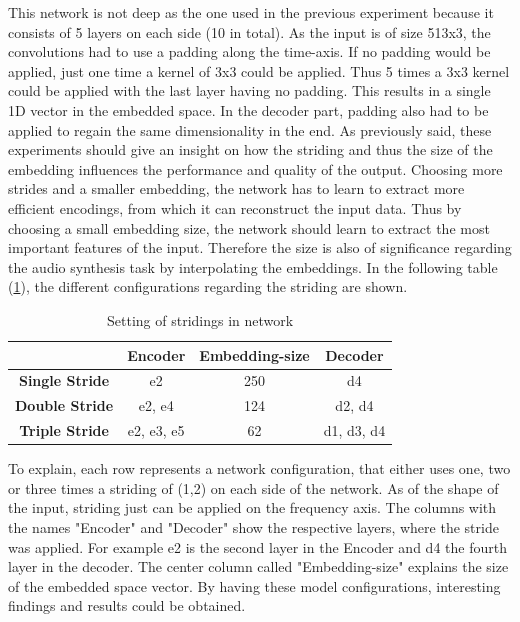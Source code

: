 This network is not deep as the one used in the previous experiment because it consists of 5 layers on each side (10 in total). As the input is of size 513x3, the convolutions had to use a padding along the time-axis. If no padding would be applied, just one time a kernel of 3x3 could be applied. Thus 5 times a 3x3 kernel could be applied with the last layer having no padding. This results in a single 1D vector in the embedded space. In the decoder part, padding also had to be applied to regain the same dimensionality in the end. As previously said, these experiments should give an insight on how the striding and thus the size of the embedding influences the performance and quality of the output. Choosing more strides and a smaller embedding, the network has to learn to extract more efficient encodings, from which it can reconstruct the input data. Thus by choosing a small embedding size, the network should learn to extract the most important features of the input. Therefore the size is also of significance regarding the audio synthesis task by interpolating the embeddings. In the following table (\ref{tab:exp_2D_strides}), the different configurations regarding the striding are shown. 


\begin{table}[htb!]
    \centering
    \begin{tabular}{|c|c|c|c|}
        \hline
         &\textbf{Encoder}&\textbf{Embedding-size}&\textbf{Decoder} \\
         \hline
        \textbf{Single Stride} & e2 & 250 & d4 \\
        \hline
        \textbf{Double Stride} & e2, e4 & 124 & d2, d4 \\
        \hline
        \textbf{Triple Stride} & e2, e3, e5 & 62 & d1, d3, d4 \\
        \hline
    \end{tabular}
    \caption{Setting of stridings in network}
    \label{tab:exp_2D_strides}
\end{table}

To explain, each row represents a network configuration, that either uses one, two or three times a striding of (1,2) on each side of the network. As of the shape of the input, striding just can be applied on the frequency axis. The columns with the names "Encoder" and "Decoder" show the respective layers, where the stride was applied. For example e2 is the second layer in the Encoder and d4 the fourth layer in the decoder. The center column called "Embedding-size" explains the size of the embedded space vector. By having these model configurations, interesting findings and results could be obtained. 

